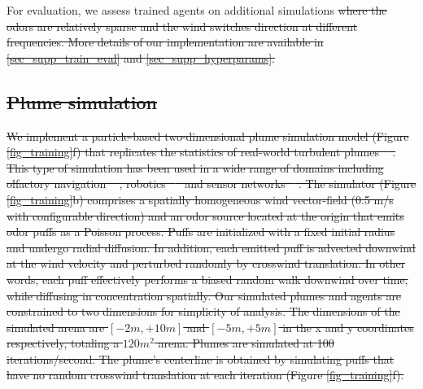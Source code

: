 \documentclass[5p,twocolumn,authoryear]{elsarticle}
\providecommand{\DIFdeltex}[1]{{\protect\color{red}\sout{#1}}}                      %
\providecommand{\DIFaddend}{} %
\providecommand{\DIFdelbegin}{} %
\providecommand{\DIFdel}[1]{\texorpdfstring{\DIFdeltex{#1}}{}} %
\newcommand{\DIFscaledelfig}{0.5}
\newlength{\DIFdelgraphicswidth} %
\newlength{\DIFdelgraphicsheight} %
\newcommand{\DIFdelincludegraphics}[2][]{%
\sbox{\DIFdelgraphicsbox}{\DIFOincludegraphics[#1]{#2}}%
\settoboxwidth{\DIFdelgraphicswidth}{\DIFdelgraphicsbox} %
\settoboxtotalheight{\DIFdelgraphicsheight}{\DIFdelgraphicsbox} %
\scalebox{\DIFscaledelfig}{%
\parbox[b]{\DIFdelgraphicswidth}{\usebox{\DIFdelgraphicsbox}\\[-\baselineskip] \rule{\DIFdelgraphicswidth}{0em}}\llap{\resizebox{\DIFdelgraphicswidth}{\DIFdelgraphicsheight}{%
\setlength{\unitlength}{\DIFdelgraphicswidth}%
\begin{picture}(1,1)%
\thicklines\linethickness{2pt} %
{\color[rgb]{1,0,0}\put(0,0){\framebox(1,1){}}}%
{\color[rgb]{1,0,0}\put(0,0){\line( 1,1){1}}}%
{\color[rgb]{1,0,0}\put(0,1){\line(1,-1){1}}}%
\end{picture}%
}\hspace*{3pt}}} %
} %
\DeclareRobustCommand{\DIFaddend}{\DIFOaddend \let\includegraphics\DIFOincludegraphics} %
\DeclareRobustCommand{\DIFdelbegin}{\DIFOdelbegin \let\includegraphics\DIFdelincludegraphics} %
\begin{document}
\DIFaddend For evaluation, we assess trained agents on additional simulations \DIFdelbegin \DIFdel{where the odors are relatively sparse and the wind switches direction at different frequencies. 
More details of our implementation are available in \ref{sec_supp_train_eval} and \ref{sec_supp_hyperparams}.
}%

\subsection{\DIFdel{Plume simulation}}
\addtocounter{subsection}{-1}%
\DIFdel{We implement a particle-based two-dimensional plume simulation model (Figure \ref{fig_training}f) that replicates the statistics of real-world turbulent plumes \mbox{%
\citep{farrell2002filament}}\hspace{0pt}%
.
This type of simulation has been used in a wide range of domains including olfactory navigation \mbox{%
\citep{carde2008navigational}}\hspace{0pt}%
, robotics \mbox{%
\citep{kowadlo2008robot} }\hspace{0pt}%
and sensor networks \mbox{%
\citep{michaelides2005plume}}\hspace{0pt}%
. 
The simulator (Figure \ref{fig_training}b) comprises a spatially homogeneous wind vector-field (0.5 m/s with configurable direction) and an odor source located at the origin that emits odor puffs as a Poisson process.
Puffs are initialized with a fixed initial radius and undergo radial diffusion.
In addition, each emitted puff is advected downwind at the wind velocity and perturbed randomly by crosswind translation.
In other words, each puff effectively performs a biased random walk downwind over time, while diffusing in concentration spatially.
Our simulated plumes and agents are constrained to two dimensions for simplicity of analysis.
The dimensions of the simulated arena are $[-2m,+10m]$ and $[-5m, +5m]$ in the x and y coordinates respectively, totaling a $120m^2$ arena.
Plumes are simulated at 100 iterations/second. 
The plume's centerline is obtained by simulating puffs that have no random crosswind translation at each iteration (Figure \ref{fig_training}f).  
}%
\end{document}
